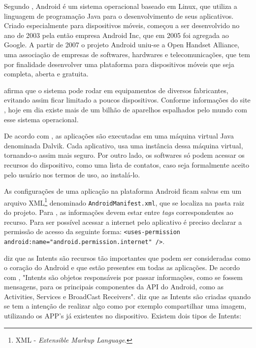 
	\par Segundo , Android é um sistema operacional
baseado em Linux, que utiliza a linguagem de programação Java para o
desenvolvimento de seus aplicativos. Criado especialmente para dispositivos
móveis, começou a ser desenvolvido no ano de 2003 pela então empresa Android
Inc, que em 2005 foi agregada ao Google. A partir de 2007 o projeto Android
uniu-se a Open Handset Alliance, uma associação de empresas de
softwares, hardwares e telecomunicações, que tem por finalidade desenvolver uma
plataforma para dispositivos móveis que seja completa, aberta e gratuita.

	\par {} afirma que o sistema pode rodar em equipamentos
de diversos fabricantes, evitando assim ficar limitado a poucos dispositivos.
Conforme informações do site , hoje em dia existe mais de
um bilhão de aparelhos espalhados pelo mundo com esse sistema operacional.

	\par De acordo com , as aplicações são executadas em
uma máquina virtual Java denominada Dalvik. Cada aplicativo, usa uma instância
dessa máquina virtual, tornando-o assim mais seguro. Por outro lado, os
softwares só podem acessar os recursos do dispositivo, como uma lista de
contatos, caso seja formalmente aceito pelo usuário nos termos de uso, ao
instalá-lo.

	\par As configurações de uma aplicação na plataforma Android ficam salvas em um
arquivo XML\footnote{XML - \textit{Extensible Markup Language}.} denominado
\texttt{AndroidManifest.xml}, que se localiza na pasta raiz do projeto. Para
, as informações devem estar entre \textit{tags}
correspondentes ao recurso. Para ser possível acessar a internet pelo
aplicativo é preciso declarar a permissão de acesso da seguinte forma:
\texttt{<uses-permission android:name="android.permission.internet" />}.

	\par {} diz que as Intents são recursos tão importantes
que podem ser consideradas como o coração do Android e que estão presentes em
todas as aplicações.	De acordo com , "Intents são
objetos responsáveis por passar informações, como se fossem mensagens, para os
principais componentes da API do Android, como as Activities, Services e
BroadCast Receivers".  diz que as Intents são criadas
quando se tem a intenção de realizar algo como por exemplo compartilhar uma
imagem, utilizando os APP's já existentes no dispositivo. Existem dois tipos de
Intents:
	

